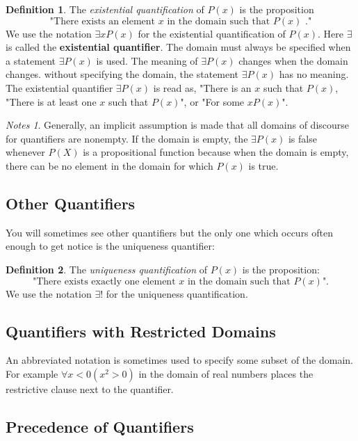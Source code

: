 \documentclass[11pt]{book} %
\theoremstyle {definition}
\newtheorem {definition}{Definition}[section]
\theoremstyle {remark}
\newtheorem*{notes}{Notes}
\begin{document}
\begin{definition}
The \textit{existential quantification} of $P(x)$ is the proposition
$$\text{"There exists an element }x \text{ in the domain such that } P(x) \text{ ."}$$
We use the notation $\exists x P(x)$ for the existential quantification of $P(x)$. Here $\exists$ is called the \textbf{existential quantifier}.
The domain must always be specified when a statement $\exists P(x)$ is used. The meaning of $\exists P(x)$ changes when the domain changes. without specifying the domain, the statement $\exists P(x)$ has no meaning. The existential quantifier $\exists P(x)$ is read as, "There is an $x$ such that $P(x)$, "There is at least one $x$ such that $P(x)$", or "For some $x P(x)$".
\end{definition}

\begin{notes}
Generally, an implicit assumption is made that all domains of discourse for quantifiers are nonempty. If the domain is empty, the $\exists P(x)$ is false whenever $P(X)$ is a propositional function because when the domain is empty, there can be no element in the domain for which $P(x)$ is true.
\end{notes}

    \subsection {Other Quantifiers}
You will sometimes see other quantifiers but the only one which occurs often enough to get notice is the uniqueness quantifier:

\begin{definition}
The \textit{uniqueness quantification} of $P(x)$ is the proposition:
$$\text{"There exists exactly one element }x \text{ in the domain such that }P(x)\text{".}$$
We use the notation $\exists !$ for the uniqueness quantification.
\end{definition}
    \subsection {Quantifiers with Restricted Domains}
An abbreviated notation is sometimes used to specify some subset of the domain. For example $\forall x <0 (x^2 >0)$ in the domain of real numbers places the restrictive clause next to the quantifier.

    \subsection {Precedence of Quantifiers}
\end{document}
